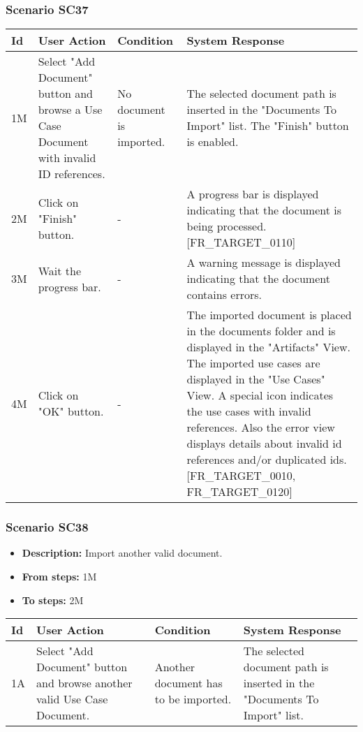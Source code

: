 \documentclass[a4paper,11pt]{article}
\newcommand{\bl}{\\ \hline}
\begin{document}
\subsubsection*{Scenario SC37}
\begin{tabular}{|p{0.4in}|p{1.5in}|p{1.5in}|p{1.5in}|}
\hline
Id & User Action & Condition & System Response \bl 
1M & Select "Add Document" button and browse a Use Case Document
						with invalid ID references.  & No document is imported. & The selected document path is inserted in the "Documents
						To Import" list. The "Finish" button is enabled.\bl
2M & Click on "Finish" button. & - & A progress bar is displayed indicating that the document
						is being processed. [FR_TARGET_0110]\bl
3M & Wait the progress bar. & - & A warning message is displayed indicating that the
						document contains errors.\bl
4M & Click on "OK" button. & - & The imported document is placed in the documents folder
						and is displayed in the "Artifacts" View. The imported use cases
						are displayed in the "Use Cases" View. A special icon indicates
						the use cases with invalid references. Also the error view
						displays details about invalid id references and/or duplicated
						ids. [FR_TARGET_0010, FR_TARGET_0120]\bl
\end{tabular}
\subsubsection*{Scenario SC38}
\begin{itemize}
\item {\bf Description:} Import another valid document.
\item {\bf From steps:} 1M
\item {\bf To steps:} 2M
\end{itemize}
\begin{tabular}{|p{0.4in}|p{1.5in}|p{1.5in}|p{1.5in}|}
\hline
Id & User Action & Condition & System Response \bl 
1A & Select "Add Document" button and browse another valid Use
						Case Document.  & Another document has to be imported. & The selected document path is inserted in the "Documents
						To Import" list.\bl
\end{tabular}
\end{document}
